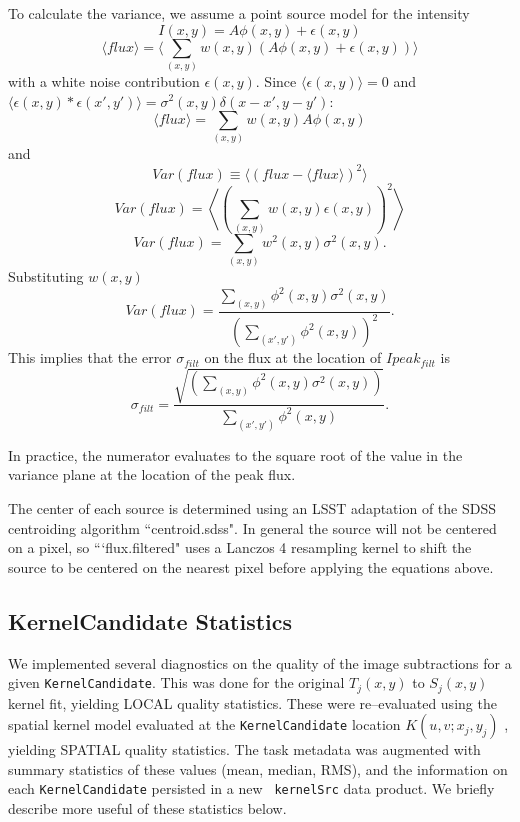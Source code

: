 \documentclass[prd, nofootinbib, floatfix, 11pt,tightenlines,times]{article}
\begin{document}
To calculate the variance, we assume a point source model for the intensity 
%
\[I(x,y) = A\phi(x,y) + \epsilon(x,y)\]
\[\langle flux \rangle = \langle \sum_{(x,y)} w(x,y)(A\phi(x,y) +\epsilon(x,y))\rangle\]
%
with a white noise contribution $\epsilon(x,y)$.  Since $\langle \epsilon(x,y) \rangle = 0$ and $\langle \epsilon(x,y) * \epsilon(x',y') \rangle = \sigma^2(x,y)\delta(x-x', y-y')$:
%
\[\langle flux \rangle = \sum_{(x,y)} w(x,y)A\phi(x,y)\]
and
\[Var(flux) \equiv \langle(flux - \langle flux \rangle)^2\rangle\]
\[Var(flux) = \left\langle{\left(\sum_{(x,y)} w(x,y)\epsilon(x,y)\right)^2}\right\rangle\]
\[Var(flux) = \sum_{(x,y)} w^2(x,y)\sigma^2(x,y).\]
Substituting $w(x,y)$
\[Var(flux) = \frac{\sum_{(x,y)}\phi^2(x,y)\sigma^2(x,y)}{(\sum_{(x',y')} \phi^2(x,y))^2}.\]
This implies that the error $\sigma_{filt}$ on the flux at the location of $Ipeak_{filt}$ is
\[\sigma_{filt} = \frac{\sqrt{(\sum_{(x,y)} \phi^2(x,y)\sigma^2(x,y))}}{\sum_{(x',y')} \phi^2(x,y)}.\]
%
%
%

In practice, the numerator evaluates to the square root of the value in the variance plane
at the location of the peak flux.

The center of each source is determined using an LSST adaptation of
the SDSS centroiding algorithm ``centroid.sdss". In general the source
will not be centered on a pixel, so ```flux.filtered" uses a Lanczos 4
resampling kernel to shift the source to be centered on the nearest
pixel before applying the equations above.

\subsection{KernelCandidate Statistics \label{sec-stats}}

We implemented several diagnostics on the quality of the image
subtractions for a given {\tt KernelCandidate}.  This was done for the
original $T_j(x,y)$ to $S_j(x,y)$ kernel fit, yielding LOCAL quality
statistics.  These were re--evaluated using the spatial kernel model
evaluated at the {\tt KernelCandidate} location $K(u,v;x_j,y_j)$ ,
yielding SPATIAL quality statistics.  The task metadata was augmented
with summary statistics of these values (mean, median, RMS), and the
information on each {\tt KernelCandidate} persisted in a new {\tt
  kernelSrc} data product.  We briefly describe more useful of these
statistics below.
\end{document}
